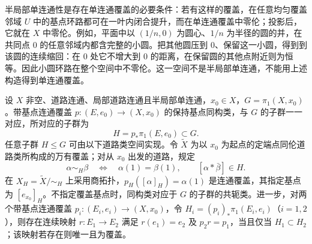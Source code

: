 半局部单连通性是存在单连通覆盖的必要条件：若有这样的覆盖，在任意均匀覆盖邻域 \(U\) 中的基点环路都可在一叶内闭合提升，而在单连通覆盖中零伦；投影后，它就在 \(X\) 中零伦。例如，平面中以 \((1/n,0)\) 为圆心、\(1/n\) 为半径的圆的并，在共同点 \(0\) 的任意邻域内都含完整的小圆。把其他圆压到 \(0\)、保留这一小圆，得到到该圆的连续缩回：在 \(0\) 处它不增大到 \(0\) 的距离，在保留圆的其他点附近则为恒等。因此小圆环路在整个空间中不零伦。这一空间不是半局部单连通，不能用上述构造得到单连通覆盖。

\begin{theorem}[连通覆盖的子群分类]\label{g2:thm:covering-classification}
	设 \(X\) 非空、道路连通、局部道路连通且半局部单连通，\(x_0\in X\)，\(G=\pi_1(X,x_0)\)。带基点连通覆盖 \(p:(E,e_0)\rightarrow(X,x_0)\) 的保持基点同构类，与 \(G\) 的子群一一对应，所对应的子群为
	\[
		H=p_*\pi_1(E,e_0)\subset G.
	\]
	任意子群 \(H\leq G\) 可由以下道路类空间实现。令 \(\widetilde X\) 为以 \(x_0\) 为起点的定端点同伦道路类所构成的万有覆盖；对从 \(x_0\) 出发的道路，规定
	\[
		\alpha\sim_H\beta
		\quad\Longleftrightarrow\quad
		\alpha(1)=\beta(1),\qquad[\alpha*\bar\beta]\in H.
	\]
	在 \(X_H=\widetilde X/{\sim_H}\) 上采用商拓扑，\(p_H([\alpha]_H)=\alpha(1)\) 是连通覆盖，其指定基点为 \([e_{x_0}]_H\)。不指定覆盖基点时，同构类对应于 \(G\) 的子群的共轭类。进一步，对两个带基点连通覆盖 \(p_i:(E_i,e_i)\rightarrow(X,x_0)\)，令 \(H_i=(p_i)_*\pi_1(E_i,e_i)\)（\(i=1,2\)），则存在连续映射 \(r:E_1\rightarrow E_2\) 满足 \(r(e_1)=e_2\) 及 \(p_2r=p_1\)，当且仅当 \(H_1\subset H_2\)；该映射若存在则唯一且为覆盖。
\end{theorem}
